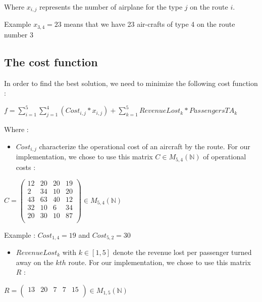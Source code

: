 \documentclass[11pt]{article}
\providecommand{\tightlist}{%
      \setlength{\itemsep}{0pt}\setlength{\parskip}{0pt}}
\begin{document}
Where \(x_{i,j}\) represents the number of airplane for the type \(j\)
on the route \(i\).

Example \(x_{3,4} = 23\) means that we have 23 air-crafts of type 4 on
the route number 3

\pagebreak

    \hypertarget{the-cost-function}{%
\subsection{The cost function}\label{the-cost-function}}

In order to find the best solution, we need to minimize the following
cost function :
\begin{center}
\(f = \sum_{i=1}^{5} \sum_{j=1}^{4}( Cost_{i,j} * x_{i,j})+ \sum_{k=1}^{5} RevenueLost_{k} * PassengersTA_{k}\)
\end{center}

Where :

\begin{itemize}
\tightlist
\item
  \(Cost_{i,j}\) characterize the operational cost of an aircraft by the
  route. For our implementation, we chose to use this matrix \(C \in M_{5,4}(\mathbb{N})\)
  of operational costs :
\end{itemize}

\begin{center}
\(C = \left( \begin{array}{cccc} 12 & 20 & 20 & 19 \\ 2 & 34 & 10 & 20 \\ 43 & 63 & 40 & 12 \\ 32 & 10 & 6 & 34 \\ 20 & 30 & 10 & 87 \\ \end{array} \right)\in M_{5,4}(\mathbb{N})\)
    
\end{center}

Example : \(Cost_{1,4} = 19\) and \(Cost_{5,2} = 30\)

\begin{itemize}
\tightlist
\item
  \(RevenueLost_{k}\) with \(k \in [1,5]\) denote the revenue lost per
  passenger turned away on the \(kth\) route. For our implementation, we
  chose to use this matrix \(R\) :
\end{itemize}

\begin{center}
\(R = \left( \begin{array}{ccccc} 13 & 20 & 7 & 7 & 15\\ \end{array} \right)\in M_{1,5}(\mathbb{N})\)
\end{center}
\end{document}
